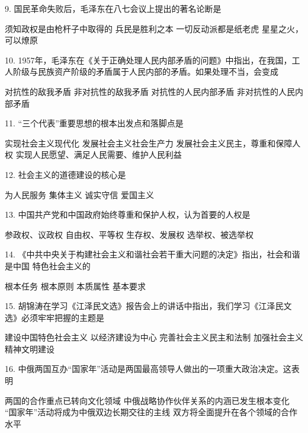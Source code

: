 9. 国民革命失败后，毛泽东在八七会议上提出的著名论断是
\begin{choices}
	 须知政权是由枪杆子中取得的
	 兵民是胜利之本
	 一切反动派都是纸老虎
	 星星之火，可以燎原
\end{choices}
10. 1957年，毛泽东在《关于正确处理人民内部矛盾的问题》中指出，在我国，工人阶级与民族资产阶级的矛盾属于人民内部的矛盾。如果处理不当，会变成
\begin{choices}
	 对抗性的敌我矛盾
	 非对抗性的敌我矛盾
	 对抗性的人民内部矛盾
	 非对抗性的人民内部矛盾
\end{choices}
11. “三个代表”重要思想的根本出发点和落脚点是
\begin{choices}
	 实现社会主义现代化
	 发展社会主义社会生产力
	 发展社会主义民主，尊重和保障人权
	 实现人民愿望、满足人民需要、维护人民利益
\end{choices}
12. 社会主义的道德建设的核心是
\begin{choices}
	 为人民服务
	 集体主义
	 诚实守信
	 爱国主义
\end{choices}
13. 中国共产党和中国政府始终尊重和保护人权，认为首要的人权是
\begin{choices}
	 参政权、议政权
	 自由权、平等权
	 生存权、发展权
	 选举权、被选举权
\end{choices}
14. 《中共中央关于构建社会主义和谐社会若干重大问题的决定》指出，社会和谐是中国 特色社会主义的
\begin{choices}
	 根本任务
	 根本原则
	 本质属性
	 基本要求
\end{choices}
15. 胡锦涛在学习《江泽民文选》报告会上的讲话中指出，我们学习《江泽民文选》必须牢牢把握的主题是
\begin{choices}
	 建设中国特色社会主义
	 以经济建设为中心
	 完善社会主义民主和法制
	 加强社会主义精神文明建设
\end{choices}
16. 中俄两国互办“国家年”活动是两国最高领导人做出的一项重大政治决定。这表明
\begin{choices}
	 两国的合作重点已转向文化领域
	 中俄战略协作伙伴关系的内涵已发生根本变化
	 “国家年”活动将成为中俄双边长期交往的主线
	 双方将全面提升在各个领域的合作水平
\end{choices}
\vspace{6pt}
